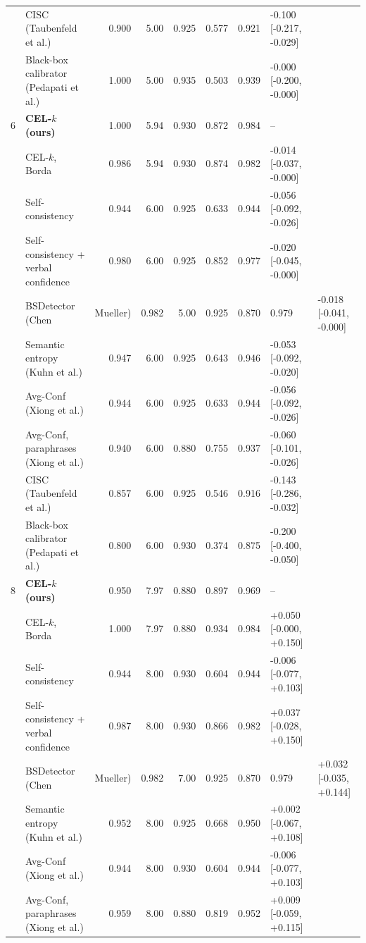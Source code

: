 \begin{table}[t]
\begin{tabular}{llrrrrrl}
 & CISC (Taubenfeld et al.) & 0.900 & 5.00 & 0.925 & 0.577 & 0.921 & -0.100 [-0.217, -0.029] \\
 & Black-box calibrator (Pedapati et al.) & 1.000 & 5.00 & 0.935 & 0.503 & 0.939 & -0.000 [-0.200, -0.000] \\
6 & \textbf{CEL-$k$ (ours)} & 1.000 & 5.94 & 0.930 & 0.872 & 0.984 & -- \\
 & \quad CEL-$k$, Borda & 0.986 & 5.94 & 0.930 & 0.874 & 0.982 & -0.014 [-0.037, -0.000] \\
 & Self-consistency & 0.944 & 6.00 & 0.925 & 0.633 & 0.944 & -0.056 [-0.092, -0.026] \\
 & Self-consistency + verbal confidence & 0.980 & 6.00 & 0.925 & 0.852 & 0.977 & -0.020 [-0.045, -0.000] \\
 & BSDetector (Chen & Mueller) & 0.982 & 5.00 & 0.925 & 0.870 & 0.979 & -0.018 [-0.041, -0.000] \\
 & Semantic entropy (Kuhn et al.) & 0.947 & 6.00 & 0.925 & 0.643 & 0.946 & -0.053 [-0.092, -0.020] \\
 & Avg-Conf (Xiong et al.) & 0.944 & 6.00 & 0.925 & 0.633 & 0.944 & -0.056 [-0.092, -0.026] \\
 & Avg-Conf, paraphrases (Xiong et al.) & 0.940 & 6.00 & 0.880 & 0.755 & 0.937 & -0.060 [-0.101, -0.026] \\
 & CISC (Taubenfeld et al.) & 0.857 & 6.00 & 0.925 & 0.546 & 0.916 & -0.143 [-0.286, -0.032] \\
 & Black-box calibrator (Pedapati et al.) & 0.800 & 6.00 & 0.930 & 0.374 & 0.875 & -0.200 [-0.400, -0.050] \\
8 & \textbf{CEL-$k$ (ours)} & 0.950 & 7.97 & 0.880 & 0.897 & 0.969 & -- \\
 & \quad CEL-$k$, Borda & 1.000 & 7.97 & 0.880 & 0.934 & 0.984 & +0.050 [-0.000, +0.150] \\
 & Self-consistency & 0.944 & 8.00 & 0.930 & 0.604 & 0.944 & -0.006 [-0.077, +0.103] \\
 & Self-consistency + verbal confidence & 0.987 & 8.00 & 0.930 & 0.866 & 0.982 & +0.037 [-0.028, +0.150] \\
 & BSDetector (Chen & Mueller) & 0.982 & 7.00 & 0.925 & 0.870 & 0.979 & +0.032 [-0.035, +0.144] \\
 & Semantic entropy (Kuhn et al.) & 0.952 & 8.00 & 0.925 & 0.668 & 0.950 & +0.002 [-0.067, +0.108] \\
 & Avg-Conf (Xiong et al.) & 0.944 & 8.00 & 0.930 & 0.604 & 0.944 & -0.006 [-0.077, +0.103] \\
 & Avg-Conf, paraphrases (Xiong et al.) & 0.959 & 8.00 & 0.880 & 0.819 & 0.952 & +0.009 [-0.059, +0.115] \\

\end{tabular}
\end{table}
